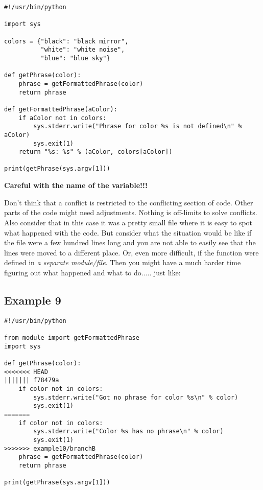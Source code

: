 \begin{lstlisting}[style=python_style,
	basicstyle=\small,
	caption={\bf example 8} - resolution]
#!/usr/bin/python

import sys

colors = {"black": "black mirror",
          "white": "white noise",
          "blue": "blue sky"}

def getPhrase(color):
    phrase = getFormattedPhrase(color)
    return phrase

def getFormattedPhrase(aColor):
    if aColor not in colors:
        sys.stderr.write("Phrase for color %s is not defined\n" % aColor)
        sys.exit(1)
    return "%s: %s" % (aColor, colors[aColor])

print(getPhrase(sys.argv[1]))
\end{lstlisting}
{\bf Careful with the name of the variable!!!}

Don't think that a conflict is restricted to the conflicting section of code. Other parts of the code might need adjustments.
Nothing is off-limits to solve conflicts. Also consider that in this case it was a pretty small file where it is easy to spot
what happened with the code. But consider what the situation would be like if the file were a few hundred lines long and you are
not able to easily see that the lines were moved to a different place. Or, even more difficult, if the function were defined in
{\it a separate module/file}. Then you might have a much harder time figuring out what happened and what to do..... just like:

\subsection{Example 9}
\label{example_09}

\begin{lstlisting}[style=python_style,
	basicstyle=\small,
	caption={\bf example 9}]
#!/usr/bin/python

from module import getFormattedPhrase
import sys

def getPhrase(color):
<<<<<<< HEAD
||||||| f78479a
    if color not in colors:
        sys.stderr.write("Got no phrase for color %s\n" % color)
        sys.exit(1)
=======
    if color not in colors:
        sys.stderr.write("Color %s has no phrase\n" % color)
        sys.exit(1)
>>>>>>> example10/branchB
    phrase = getFormattedPhrase(color)
    return phrase

print(getPhrase(sys.argv[1]))
\end{lstlisting}

